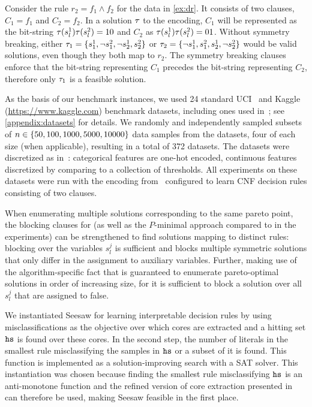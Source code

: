 \begin{example}
  Consider the rule $r_2 = f_1 \land f_2$ for the data in \cref{ex:dr}.
  It consists of two clauses, $C_1 = f_1$ and $C_2 = f_2$.
  In a solution $\tau$ to the encoding, $C_1$ will be represented as the bit-string $\tau(s_l^1)\tau(s_l^2)=10$ and $C_2$ as $\tau(s_l^1)\tau(s_l^2)=01$.
  Without symmetry breaking, either $\tau_1 = \{s_1^1, \lnot s_1^2, \lnot s_2^1, s_2^2\}$ or $\tau_2 = \{\lnot s_1^1, s_1^2, s_2^1, \lnot s_2^2\}$ would be valid solutions, even though they both map to $r_2$.
  The symmetry breaking clauses enforce that the bit-string representing $C_1$ precedes the bit-string representing $C_2$, therefore only $\tau_1$ is a feasible solution.
\end{example}

As the basis of our benchmark instances, we used 24 standard UCI~\autocite{UciMlr} and Kaggle ({\small\url{https://www.kaggle.com}}) benchmark datasets, including ones used in~\textcite{DBLP:conf/cp/MaliotovM18}; see \cref{appendix:datasets} for details.
We randomly and independently sampled subsets of $n\in\{50,100,1000,5000,10000\}$ data samples from the datasets, four of each size (when applicable), resulting in a total of 372 datasets.
The datasets were discretized as in~\textcite{DBLP:conf/cp/MaliotovM18}:
categorical features are one-hot encoded, continuous features discretized by comparing to a collection of thresholds.
All experiments on these datasets were run with the encoding from~\textcite{DBLP:conf/cp/MaliotovM18} configured to learn CNF decision rules consisting of two clauses.

When enumerating multiple solutions corresponding to the same pareto point, the blocking clauses for \algname{} (as well as the $P$-minimal approach compared to in the experiments) can be strengthened to find solutions mapping to distinct rules:
blocking over the variables $s_l^j$ is sufficient and blocks multiple symmetric solutions that only differ in the assignment to auxiliary variables.
Further, making use of the algorithm-specific fact that \algname{} is guaranteed to enumerate pareto-optimal solutions in order of increasing size, for \algname{} it is sufficient to block a solution over all $s_l^j$ that are assigned to false.

We instantiated Seesaw for learning interpretable decision rules by using misclassifications as the objective over which cores are extracted and a hitting set $\texttt{hs}$ is found over these cores.
In the second step, the number of literals in the smallest rule misclassifying the samples in $\texttt{hs}$ or a subset of it is found.
This function is implemented as a solution-improving search with a SAT solver.
This instantiation was chosen because finding the smallest rule misclassifying $\texttt{hs}$ is an anti-monotone function and the refined version of core extraction presented in~\textcite{DBLP:conf/cp/JanotaMSM21} can therefore be used, making Seesaw feasible in the first place.

